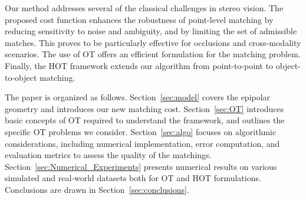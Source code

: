 \documentclass[10pt, twocolumn]{article}
\theoremstyle{definition}
\begin{document}
Our method addresses several of the classical challenges in stereo vision. The proposed cost function enhances the robustness of point-level matching by reducing sensitivity to noise and ambiguity, and by limiting the set of admissible matches. This proves to be particularly effective for occlusions and cross-modality scenarios. The use of OT offers an efficient formulation for the matching problem. Finally, the HOT framework extends our algorithm from point-to-point to object-to-object matching.

The paper is organized as follows.
Section~\ref{sec:model} covers the epipolar geometry and introduces our new matching cost. 
Section~\ref{sec:OT} introduces basic concepts of OT required to understand the framework, and outlines the specific OT problems we consider. 
Section~\ref{sec:algo} focuses on algorithmic considerations, including numerical implementation, error computation, and evaluation metrics to assess the quality of the matchings. Section~\ref{sec:Numerical_Experiments} presents numerical results on various simulated and real-world datasets  both for OT and HOT formulations.
Conclusions are drawn in Section~\ref{sec:conclusions}.



\end{document}
